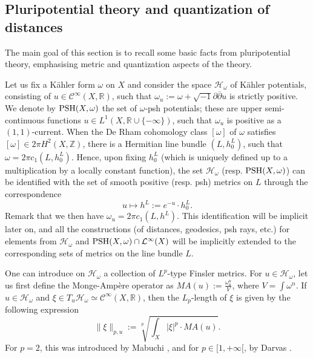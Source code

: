 \documentclass[12pt]{article}
\numberwithin{equation}{section}
\theoremstyle{theorem}
\theoremstyle{definition}
\theoremstyle{remark}
\newcommand{\imun} {\sqrt{-1}}
\newcommand{\real}{\mathbb{R}}
\newcommand{\ccal}{\mathscr{C}}
\newcommand{\dbar}{ \overline{\partial} }
\begin{document}
	\subsection{Pluripotential theory and quantization of distances}\label{sect_pp_thr}
	The main goal of this section is to recall some basic facts from pluripotential theory, emphasising metric and quantization aspects of the theory.
	\par 
	Let us fix a Kähler form $\omega$ on $X$ and consider the space $\mathcal{H}_{\omega}$ of Kähler potentials, consisting of $u \in \ccal^{\infty}(X, \real)$, such that $\omega_u := \omega + \imun \partial \dbar u$ is strictly positive.
	We denote by ${\rm{PSH}}(X, \omega)$ the set of $\omega$-psh potentials; these are upper semi-continuous functions $u \in L^1(X, \real \cup \{ -\infty \})$, such that $\omega_u$ is positive as a $(1, 1)$-current.
	When the De Rham cohomology class $[\omega]$ of $\omega$ satisfies $[\omega] \in 2 \pi H^2(X, \mathbb{Z})$, there is a Hermitian line bundle $(L, h^L_0)$, such that $\omega = 2 \pi c_1(L, h^L_0)$. 
	Hence, upon fixing $h^L_0$ (which is uniquely defined up to a multiplication by a locally constant function), the set $\mathcal{H}_{\omega}$  (resp. ${\rm{PSH}}(X, \omega)$) can be identified with the set of smooth positive (resp. psh) metrics on $L$ through the correspondence
	\begin{equation}\label{eq_pot_to_metr}
		u \mapsto h^L := e^{-u} \cdot h^L_0.
	\end{equation}
	Remark that we then have $\omega_u = 2 \pi c_1(L, h^L)$.
	This identification will be implicit later on, and all the constructions (of distances, geodesics, psh rays, etc.) for elements from $\mathcal{H}_{\omega}$ and ${\rm{PSH}}(X, \omega) \cap \mathcal{L}^{\infty}(X)$ will be implicitly extended to the corresponding sets of metrics on the line bundle $L$.
	\par 
	One can introduce on $\mathcal{H}_{\omega}$ a collection of $L^p$-type Finsler metrics.
	For $u \in \mathcal{H}_{\omega}$, let us first define the Monge-Ampère operator as $MA(u) := \frac{\omega_u^n}{V}$, where $V = \int \omega^n$.
	If $u \in \mathcal{H}_{\omega}$ and $\xi \in T_u \mathcal{H}_{\omega} \simeq \ccal^{\infty}(X, \real)$, then the $L_p$-length of $\xi$ is given by the following expression
	\begin{equation}\label{eq_finsl_dist_fir}
		\| \xi \|_{p, u}
		:=
		\sqrt[p]{
		 \int_X |\xi|^p \cdot MA(u)}.
	\end{equation}
	For $p = 2$, this was introduced by Mabuchi \cite{Mabuchi}, and for $p \in [1, +\infty[$, by Darvas \cite{DarvasFinEnerg}.
\end{document}
